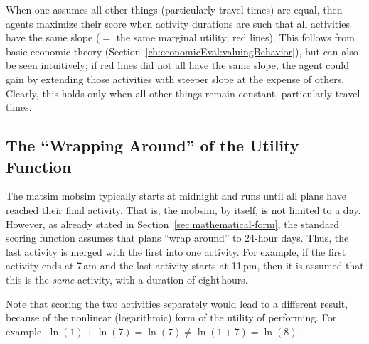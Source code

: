 When one assumes all other things (particularly travel times) are equal, then agents maximize their score when activity durations are such that all activities have the same slope ($=$ the same marginal utility; red lines).  This follows from basic economic theory (\cf Section~\ref{ch:economicEval:valuingBehavior}), but can also be seen intuitively; if red lines did not all have the same slope, the agent could gain by extending those activities with steeper slope at the expense of others.  Clearly, this holds only when all other things remain constant, particularly travel times.

\subsection{The \enquote{Wrapping Around} of the Utility Function}
\label{sec:wrap-around}
The \gls{matsim} \gls{mobsim} typically starts at midnight and runs until all plans have reached their final activity.  That is, the \gls{mobsim}, by itself, is not limited to a day.  However, as already stated in Section~\ref{sec:mathematical-form}, the standard scoring function assumes that plans ``wrap around'' to 24-hour days.  Thus, the last activity is merged with the first into one activity. For example, if the first activity ends at 7\,am and the last activity starts at 11\,pm, then it is assumed that this is the \emph{same} activity, with a duration of eight\,hours.

Note that scoring the two activities separately would lead to a different result, because of the nonlinear (logarithmic) form of the utility of performing. For example, $\ln(1) + \ln(7) = \ln(7) \ne \ln(1 + 7) = \ln(8)$.

